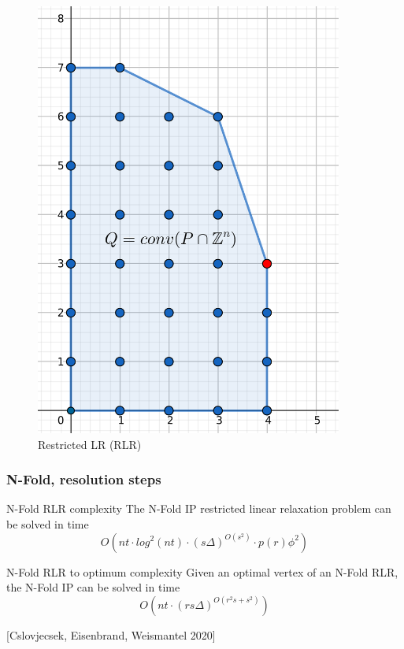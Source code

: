 \documentclass{beamer}
\begin{document}
\begin{frame}
\begin{figure}[!tbp]
\begin{minipage}[b]{0.45\textwidth}
            \includegraphics[width=0.9\textwidth]{images/IP(10).png}
            \caption{Restricted LR (RLR)}
        \end{minipage}
        \end{figure}
    \end{frame}
    \begin{frame}
        \frametitle{N-Fold, resolution steps}
        \begin{block}{N-Fold RLR complexity}
            The N-Fold IP restricted linear relaxation problem can be solved in time
            \begin{equation*}
                O(nt \cdot log^2(nt)\cdot(s\Delta)^{O(s^2)} \cdot p(r)\phi^2)
            \end{equation*}
        \end{block}
        \vspace{0.5cm}
        \begin{block}{N-Fold RLR to optimum complexity}
            Given an optimal vertex of an N-Fold RLR, the N-Fold IP can be solved in time
            \begin{equation*}
                O(nt \cdot (rs\Delta)^{O(r^2s+s^2)})
            \end{equation*}
        \end{block}
        [Cslovjecsek, Eisenbrand, Weismantel 2020]
    \end{frame}
\end{document}
